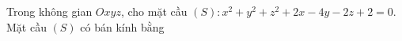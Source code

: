 \begin{ex}
Trong không gian $Oxyz$, cho mặt cầu $(S)\colon x^2+y^2+z^2+2x-4y-2z+2=0$. Mặt cầu $(S)$ có bán kính bằng
\end{ex}
